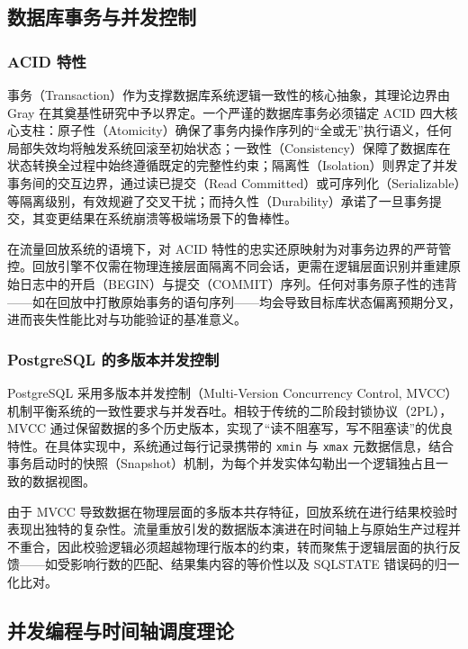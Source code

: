 \subsection{数据库事务与并发控制}

\subsubsection{ACID 特性}

事务（Transaction）作为支撑数据库系统逻辑一致性的核心抽象，其理论边界由 Gray\cite{ACIDProperties} 在其奠基性研究中予以界定。一个严谨的数据库事务必须锚定 ACID 四大核心支柱：原子性（Atomicity）确保了事务内操作序列的“全或无”执行语义，任何局部失效均将触发系统回滚至初始状态；一致性（Consistency）保障了数据库在状态转换全过程中始终遵循既定的完整性约束；隔离性（Isolation）则界定了并发事务间的交互边界，通过读已提交（Read Committed）或可序列化（Serializable）等隔离级别\cite{SQLStandard, Serializability}，有效规避了交叉干扰；而持久性（Durability）承诺了一旦事务提交，其变更结果在系统崩溃等极端场景下的鲁棒性\cite{TransactionProcessing}。

在流量回放系统的语境下，对 ACID 特性的忠实还原映射为对事务边界的严苛管控。回放引擎不仅需在物理连接层面隔离不同会话，更需在逻辑层面识别并重建原始日志中的开启（BEGIN）与提交（COMMIT）序列。任何对事务原子性的违背——如在回放中打散原始事务的语句序列——均会导致目标库状态偏离预期分叉，进而丧失性能比对与功能验证的基准意义。

\subsubsection{PostgreSQL 的多版本并发控制}

PostgreSQL 采用多版本并发控制（Multi-Version Concurrency Control, MVCC）\cite{MVCC} 机制平衡系统的一致性要求与并发吞吐。相较于传统的二阶段封锁协议（2PL）\cite{TwoPhaseLocking}，MVCC 通过保留数据的多个历史版本，实现了“读不阻塞写，写不阻塞读”的优良特性。在具体实现中\cite{PostgreSQLDesign}，系统通过每行记录携带的 \texttt{xmin} 与 \texttt{xmax} 元数据信息，结合事务启动时的快照（Snapshot）机制，为每个并发实体勾勒出一个逻辑独占且一致的数据视图。

由于 MVCC 导致数据在物理层面的多版本共存特征，回放系统在进行结果校验时表现出独特的复杂性。流量重放引发的数据版本演进在时间轴上与原始生产过程并不重合，因此校验逻辑必须超越物理行版本的约束，转而聚焦于逻辑层面的执行反馈——如受影响行数的匹配、结果集内容的等价性以及 SQLSTATE 错误码的归一化比对。

\subsection{并发编程与时间轴调度理论}

